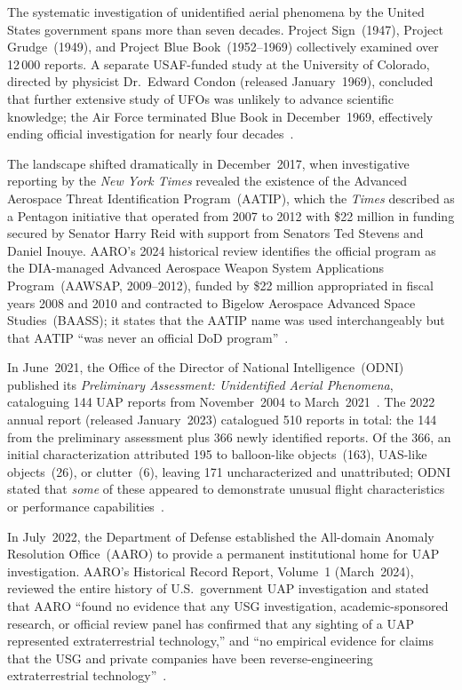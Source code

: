 \documentclass[aps,prd,twocolumn,superscriptaddress,nofootinbib,floatfix]{revtex4-2}
\begin{document}
The systematic investigation of unidentified aerial phenomena by the United States
government spans more than seven decades. Project Sign~(1947), Project
Grudge~(1949), and Project Blue Book~(1952--1969) collectively examined over
12\,000 reports. A separate USAF-funded study at the University of Colorado,
directed by physicist Dr.~Edward Condon (released January~1969), concluded that
further extensive study of UFOs was unlikely to advance scientific knowledge; the
Air Force terminated Blue Book in December~1969, effectively ending official
investigation for nearly four decades~\cite{AARO2024}.

The landscape shifted dramatically in December~2017, when investigative reporting
by the \textit{New York Times} revealed the existence of the Advanced Aerospace
Threat Identification Program~(AATIP), which the \textit{Times} described as a
Pentagon initiative that operated from 2007 to 2012 with \$22 million in funding
secured by Senator Harry Reid with support from Senators Ted Stevens and Daniel
Inouye. AARO's 2024 historical review identifies the official program as the
DIA-managed Advanced Aerospace Weapon System Applications Program~(AAWSAP,
2009--2012), funded by \$22 million appropriated in fiscal years 2008 and 2010
and contracted to Bigelow Aerospace Advanced Space Studies~(BAASS); it states that
the AATIP name was used interchangeably but that AATIP ``was never an official DoD
program''~\cite{AARO2024}.

In June~2021, the Office of the Director of National Intelligence~(ODNI)
published its \textit{Preliminary Assessment: Unidentified Aerial Phenomena},
cataloguing 144 UAP reports from November~2004 to March~2021~\cite{ODNI2021}.
The 2022 annual report (released January~2023) catalogued 510 reports in total:
the 144 from the preliminary assessment plus 366 newly identified reports. Of the
366, an initial characterization attributed 195 to balloon-like objects~(163),
UAS-like objects~(26), or clutter~(6), leaving 171 uncharacterized and
unattributed; ODNI stated that \emph{some} of these appeared to demonstrate
unusual flight characteristics or performance capabilities~\cite{ODNI2023}.

In July~2022, the Department of Defense established the All-domain Anomaly
Resolution Office~(AARO) to provide a permanent institutional home for UAP
investigation. AARO's Historical Record Report, Volume~1 (March~2024), reviewed
the entire history of U.S.\ government UAP investigation and stated that AARO
``found no evidence that any USG investigation, academic-sponsored research, or
official review panel has confirmed that any sighting of a UAP represented
extraterrestrial technology,'' and ``no empirical evidence for claims that the USG
and private companies have been reverse-engineering extraterrestrial
technology''~\cite{AARO2024}.
\end{document}
